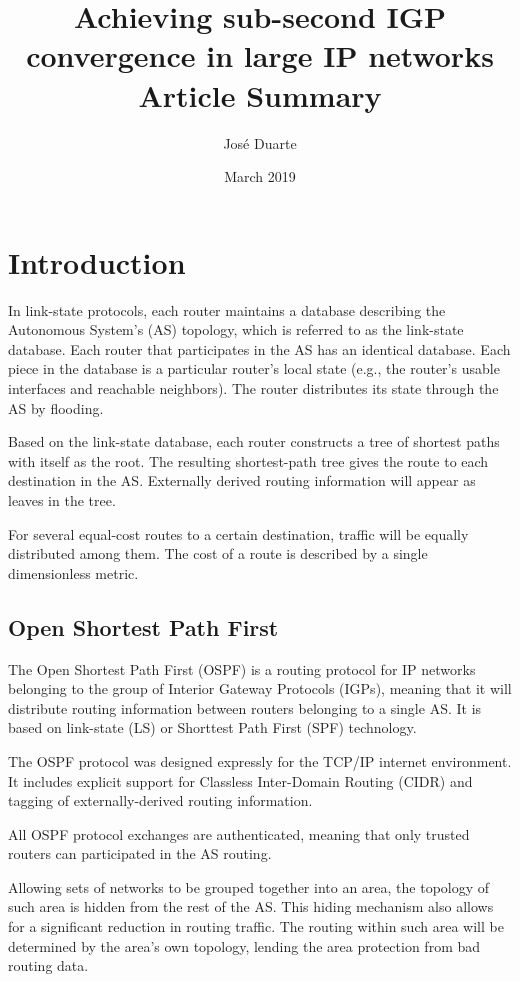 \documentclass[a4paper, 11pt, UTF8]{article}
\title{%
Achieving sub-second IGP convergence in large IP networks \\
	\large Article Summary}
\author{José Duarte}
\date{March 2019}
\begin{document}
\maketitle

\section{Introduction}
In link-state protocols, each router maintains a database describing the Autonomous System's (AS) topology, which is referred to as the link-state database.
Each router that participates in the AS has an identical database.
Each piece in the database is a particular router's local state (e.g., the router's usable interfaces and reachable neighbors).
The router distributes its state through the AS by flooding.

Based on the link-state database, each router constructs a tree of shortest paths with itself as the root.
The resulting shortest-path tree gives the route to each destination in the AS.
Externally derived routing information will appear as leaves in the tree.

For several equal-cost routes to a certain destination, traffic will be equally distributed among them.
The cost of a route is described by a single dimensionless metric.\cite{J.Moy1998}

\subsection{Open Shortest Path First}
The Open Shortest Path First (OSPF) is a routing protocol for IP networks belonging to the group of Interior Gateway Protocols (IGPs), meaning that it will distribute routing information between routers belonging to a single AS.
It is based on link-state (LS) or Shorttest Path First (SPF) technology.

The OSPF protocol was designed expressly for the TCP/IP internet environment. 
It includes explicit support for Classless Inter-Domain Routing (CIDR) and tagging of externally-derived routing information.

All OSPF protocol exchanges are authenticated, meaning that only trusted routers can participated in the AS routing.

Allowing sets of networks to be grouped together into an area, the topology of such area is hidden from the rest of the AS.
This hiding mechanism also allows for a significant reduction in routing traffic.
The routing within such area will be determined by the area's own topology, lending the area protection from bad routing data.
\end{document}
